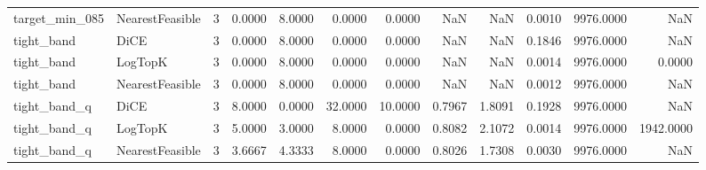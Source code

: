 \begin{tabular}{llrrrrrrrrrr}
      target\_min\_085 & NearestFeasible &      3 &            0.0000 &          8.0000 &          0.0000 &        0.0000 &                NaN &            NaN &       0.0010 &          9976.0000 &                   NaN \\
          tight\_band &            DiCE &      3 &            0.0000 &          8.0000 &          0.0000 &        0.0000 &                NaN &            NaN &       0.1846 &          9976.0000 &                   NaN \\
          tight\_band &         LogTopK &      3 &            0.0000 &          8.0000 &          0.0000 &        0.0000 &                NaN &            NaN &       0.0014 &          9976.0000 &                0.0000 \\
          tight\_band & NearestFeasible &      3 &            0.0000 &          8.0000 &          0.0000 &        0.0000 &                NaN &            NaN &       0.0012 &          9976.0000 &                   NaN \\
        tight\_band\_q &            DiCE &      3 &            8.0000 &          0.0000 &         32.0000 &       10.0000 &             0.7967 &         1.8091 &       0.1928 &          9976.0000 &                   NaN \\
        tight\_band\_q &         LogTopK &      3 &            5.0000 &          3.0000 &          8.0000 &        0.0000 &             0.8082 &         2.1072 &       0.0014 &          9976.0000 &             1942.0000 \\
        tight\_band\_q & NearestFeasible &      3 &            3.6667 &          4.3333 &          8.0000 &        0.0000 &             0.8026 &         1.7308 &       0.0030 &          9976.0000 &                   NaN \\
\bottomrule
\end{tabular}
